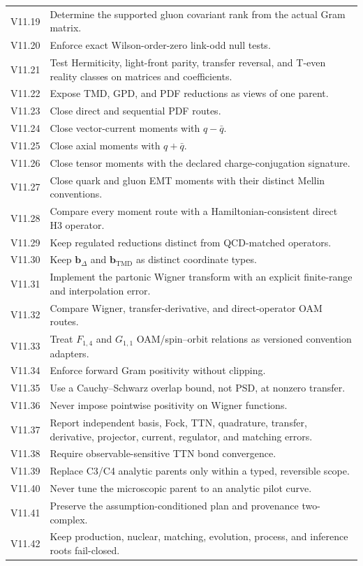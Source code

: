 \documentclass[11pt]{article}
\newcommand{\bD}{\bm{b}_{\Delta}}
\newcommand{\bM}{\bm{b}_{\mathrm{TMD}}}
\begin{document}
\begin{longtable}{L{0.13\textwidth}L{0.79\textwidth}}
V11.19 & Determine the supported gluon covariant rank from the actual Gram
matrix.\\
V11.20 & Enforce exact Wilson-order-zero link-odd null tests.\\
V11.21 & Test Hermiticity, light-front parity, transfer reversal, and T-even
reality classes on matrices and coefficients.\\
V11.22 & Expose TMD, GPD, and PDF reductions as views of one parent.\\
V11.23 & Close direct and sequential PDF routes.\\
V11.24 & Close vector-current moments with \(q-\bar q\).\\
V11.25 & Close axial moments with \(q+\bar q\).\\
V11.26 & Close tensor moments with the declared charge-conjugation signature.\\
V11.27 & Close quark and gluon EMT moments with their distinct Mellin
conventions.\\
V11.28 & Compare every moment route with a Hamiltonian-consistent direct H3
operator.\\
V11.29 & Keep regulated reductions distinct from QCD-matched operators.\\
V11.30 & Keep \(\bD\) and \(\bM\) as distinct coordinate types.\\
V11.31 & Implement the partonic Wigner transform with an explicit finite-range
and interpolation error.\\
V11.32 & Compare Wigner, transfer-derivative, and direct-operator OAM routes.\\
V11.33 & Treat \(F_{1,4}\) and \(G_{1,1}\) OAM/spin--orbit relations as
versioned convention adapters.\\
V11.34 & Enforce forward Gram positivity without clipping.\\
V11.35 & Use a Cauchy--Schwarz overlap bound, not PSD, at nonzero transfer.\\
V11.36 & Never impose pointwise positivity on Wigner functions.\\
V11.37 & Report independent basis, Fock, TTN, quadrature, transfer, derivative,
projector, current, regulator, and matching errors.\\
V11.38 & Require observable-sensitive TTN bond convergence.\\
V11.39 & Replace C3/C4 analytic parents only within a typed, reversible scope.\\
V11.40 & Never tune the microscopic parent to an analytic pilot curve.\\
V11.41 & Preserve the assumption-conditioned plan and provenance two-complex.\\
V11.42 & Keep production, nuclear, matching, evolution, process, and inference
roots fail-closed.\\
\bottomrule
\end{longtable}
\end{document}
